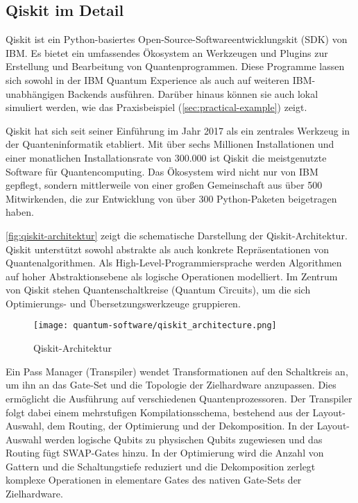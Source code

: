 \subsection{Qiskit im Detail}
\label{sec:qiskit-details}

Qiskit ist ein Python-basiertes Open-Source-Softwareentwicklungskit (SDK) von IBM. Es bietet ein umfassendes Ökosystem an Werkzeugen und Plugins zur Erstellung und Bearbeitung von Quantenprogrammen. Diese Programme lassen sich sowohl in der IBM Quantum Experience als auch auf weiteren IBM-unabhängigen Backends ausführen. \autocite{singhSurveyAvailableTools2024a} Darüber hinaus können sie auch lokal simuliert werden, wie das Praxisbeispiel (\autoref{sec:practical-example}) zeigt. 

Qiskit hat sich seit seiner Einführung im Jahr 2017 als ein zentrales Werkzeug in der Quanteninformatik etabliert. Mit über sechs Millionen Installationen und einer monatlichen Installationsrate von 300.000 ist Qiskit die meistgenutzte Software für Quantencomputing. Das Ökosystem wird nicht nur von IBM gepflegt, sondern mittlerweile von einer großen Gemeinschaft aus über 500 Mitwirkenden, die zur Entwicklung von über 300 Python-Paketen beigetragen haben. \autocite{javadi-abhari_quantum_2024}

\autoref{fig:qiskit-architektur} zeigt die schematische Darstellung der Qiskit-Architektur. Qiskit unterstützt sowohl abstrakte als auch konkrete Repräsentationen von Quantenalgorithmen. Als High-Level-Programmiersprache werden Algorithmen auf hoher Abstraktionsebene als logische Operationen modelliert. Im Zentrum von Qiskit stehen Quantenschaltkreise (Quantum Circuits), um die sich Optimierungs- und Übersetzungswerkzeuge gruppieren. \autocite{javadi-abhari_quantum_2024}

\begin{figure}[H]
    \centering
    \texttt{[image: quantum-software/qiskit\_architecture.png]}
    \caption{Qiskit-Architektur \autocite{javadi-abhari_quantum_2024}}
    \label{fig:qiskit-architektur}
\end{figure}

Ein Pass Manager (Transpiler) wendet Transformationen auf den Schaltkreis an, um ihn an das Gate-Set und die Topologie der Zielhardware anzupassen. Dies ermöglicht die Ausführung auf verschiedenen Quantenprozessoren. Der Transpiler folgt dabei einem mehrstufigen Kompilationsschema, bestehend aus der Layout-Auswahl, dem Routing, der Optimierung und der Dekomposition. In der Layout-Auswahl werden logische Qubits zu physischen Qubits zugewiesen und das Routing fügt SWAP-Gates hinzu. In der Optimierung wird die Anzahl von Gattern und die Schaltungstiefe reduziert und die Dekomposition zerlegt komplexe Operationen in elementare Gates des nativen Gate-Sets der Zielhardware. \autocite{javadi-abhari_quantum_2024}

